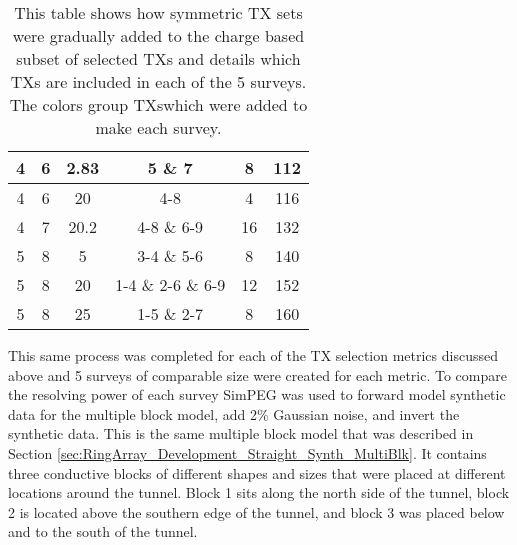 \documentclass[preprint,authoryear,12pt]{elsarticle}
\providecommand{\DIFaddtex}[1]{{\protect\color{blue}\uwave{#1}}} %
\providecommand{\DIFaddFL}[1]{\DIFadd{#1}} %
\providecommand{\DIFaddbeginFL}{} %
\providecommand{\DIFaddendFL}{} %
\providecommand{\DIFadd}[1]{\texorpdfstring{\DIFaddtex{#1}}{#1}} %
\begin{document}
\begin{table} [htp]
\begin{center}
\begin{tabular}{| c | c | c | c | c | c |}
         \hline
         \rowcolor{Yellow}
         4 & 6 & 2.83 & 5 \& 7 & 8 & 112 \\
         \hline
         \rowcolor{Yellow}
         4 & 6 & 20 & 4-8 & 4 & 116 \\
         \hline
         \rowcolor{Yellow}
         4 & 7 & 20.2 & 4-8 \& 6-9 & 16 & 132 \\
         \hline
         \rowcolor{Gray}
         5 & 8 & 5 & 3-4 \& 5-6 & 8 & 140 \\
         \hline
         \rowcolor{Gray}
         5 & 8 & 20 & 1-4 \& 2-6 \& 6-9 & 12 & 152 \\
         \hline
         \rowcolor{Gray}
         5 & 8 & 25 & 1-5 \& 2-7 & 8 & 160 \\
         \hline
      \end{tabular}
   \end{center}
\caption{This table shows how symmetric TX sets were gradually added to the charge based subset of selected TXs and details which TXs are included in each of the 5 surveys. The colors group TXs\DIFaddbeginFL \DIFaddFL{, }\DIFaddendFL which were added to make each survey.}
\label{table:SurveyDesign_Charge_SelectedTXs}
\end{table}


This same process was completed for each of the TX selection metrics discussed above and 5 surveys of comparable size were created for each metric. To compare the resolving power of each survey SimPEG was used to forward model synthetic data for the multiple block model, add 2\% Gaussian noise, and invert the synthetic data. This is the same multiple block model that was described in Section \ref{sec:RingArray_Development_Straight_Synth_MultiBlk}. It contains three conductive blocks of different shapes and sizes that were placed at different locations around the tunnel. Block 1 sits along the north side of the tunnel, block 2 is located above the southern edge of the tunnel, and block 3 was placed below and to the south of the tunnel.
\end{document}
